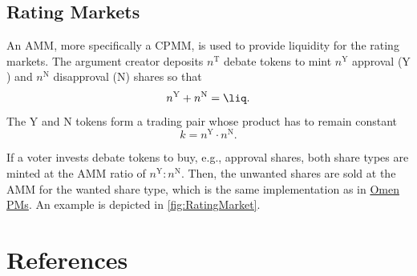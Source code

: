 \documentclass[%
aip,
amsmath,amssymb,
reprint,%
unsortedaddress,
nofootinbib
]{revtex4-2}
\newcommand{\T}{\text{T}}
\newcommand{\Y}{\text{Y}}
\newcommand{\N}{\text{N}}
\begin{document}
\subsection{Rating Markets}\label{sec:RatingMarkets}
An \ac{AMM}, more specifically a \ac{CPMM}, is used to provide liquidity for the rating markets.
The argument creator deposits $n^\T$ debate tokens 
to mint 
$n^\Y$ approval ($\Y$) and 
$n^\N$ disapproval ($\N$) shares
so that
\begin{equation}
	n^\Y+n^\N = \liq.
\end{equation}
The $\Y$ and $\N$ tokens form a trading pair
whose product has to remain constant
\begin{equation}
	k = n^\Y\cdot n^\N.
\end{equation}

If a voter invests debate tokens to buy, e.g., approval shares,
both share types are minted at the  \ac{AMM} ratio of $n^\Y: n^\N$.
Then, the unwanted shares are sold at the \ac{AMM} for the wanted share type, 
which is the same implementation as in 
\href{https://omen.eth.link/}{Omen \acp{PM}}\cite{Omen2020}.
An example is depicted in \cref{fig:RatingMarket}.
\\

\section*{References}
%

\end{document}
